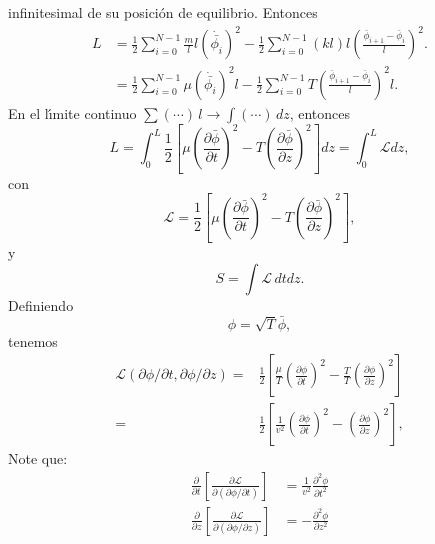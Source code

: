 infinitesimal de su posici\'on de equilibrio. Entonces
\begin{align}
L&=\frac{1}{2}\sum_{i=0}^{N-1}\frac{m}{l}l
  \left(
    \dot{\bar{\phi_i}}
  \right)^2-\frac{1}{2}\sum_{i=0}^{N-1}(k l) l
  \left(
\frac{\bar\phi_{i+1}-\bar\phi_{i}}{l}
  \right)^2.\nonumber\\
&=\frac{1}{2}\sum_{i=0}^{N-1}\mu
  \left(
    \dot{\bar{\phi_i}}
  \right)^2l-\frac{1}{2}\sum_{i=0}^{N-1}T
  \left(
\frac{\bar\phi_{i+1}-\bar\phi_{i}}{l}
  \right)^2l.
\label{eq:1strLsumm}
\end{align}
En el l\'\i mite continuo $\sum(\cdots)\,l\to\int(\cdots)\,dz$, entonces 
\begin{equation}
\label{eq:238}
  L=\int_0^L\frac{1}{2}
\left[
  \mu\left(\frac{\partial\bar\phi}{\partial t}\right)^2- T\left(\frac{\partial\bar\phi}{\partial z}\right)^2
\right]dz=\int_0^L\mathcal{L}dz,
\end{equation}
con
\begin{equation}
  \label{eq:call1}
  \mathcal{L}=\frac{1}{2}
\left[
  \mu\left(\frac{\partial\bar\phi}{\partial t}\right)^2- T\left(\frac{\partial\bar\phi}{\partial z}\right)^2
\right],
\end{equation}
y
\begin{equation}
  \label{eq:Scall}
  S=\int\mathcal{L}\,dtdz.
\end{equation}
Definiendo
\begin{equation}
  \label{eq:barff}
  \phi=\sqrt{T}\bar\phi,
\end{equation}
tenemos
\begin{align}
  \label{eq:call2}
  \mathcal{L}(\partial\phi/\partial t,\partial\phi/\partial z)=&
\frac{1}{2}
\left[
  \frac{\mu}{T}\left(\frac{\partial\phi}{\partial t}\right)^2- \frac{T}{T}\left(\frac{\partial\phi}{\partial z}\right)^2
\right]\nonumber\\
=&\frac{1}{2}
\left[
  \frac{1}{v^2}\left(\frac{\partial\phi}{\partial t}\right)^2-\left(\frac{\partial\phi}{\partial z}\right)^2
\right],
\end{align}
Note que:
\begin{align}
  \label{eq:dcalt}
  \frac{\partial}{\partial t}
  \left[
    \frac{\partial\mathcal{L}}{\partial
      (\partial\phi/\partial t)}
  \right]&=    \frac{1}{v^2}\frac{\partial^2\phi}{\partial t^2}\\
  \label{eq:dcalz} %
  \frac{\partial}{\partial z}
  \left[
    \frac{\partial\mathcal{L}}{\partial
      (\partial\phi/\partial z)}
  \right]&= -\frac{\partial^2\phi}{\partial z^2}
\end{align}



